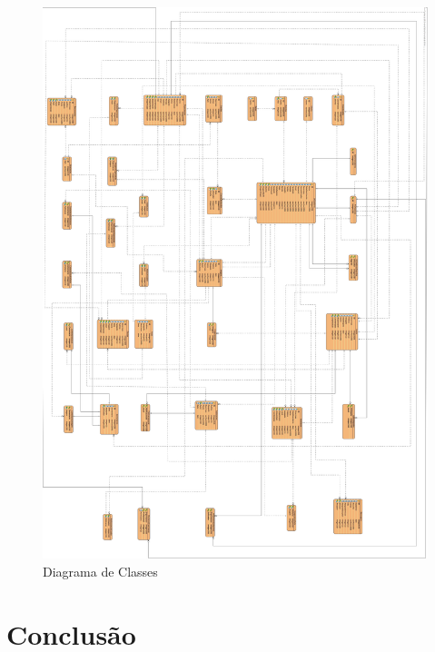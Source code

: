 \documentclass[12pt,a4paper]{article}
\begin{document}
\begin{figure}[h!]
\centering
\includegraphics[scale=0.15]{basedados}
\caption{Diagrama de Classes} 
\end{figure} 

\clearpage
\section{Conclusão} 
 
\end{document}
